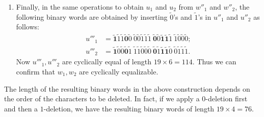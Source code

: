 \documentclass{article}
\theoremstyle{definition}
\begin{document}
\begin{enumerate}
    \item Finally, in the same operations to obtain $u_1$ and $u_2$ from $w''_1$ and $w''_2$, the following binary words are obtained by inserting $\tilde{0}$'s and $\tilde{1}$'s in $u''_1$ and $u''_2$ as follows:
    \[
        \begin{split}
            u'''_1&=\mathbf{\tilde{1}}\tilde{1}\tilde{1}\mathbf{\tilde{0}}\tilde{0}\ \tilde{0}\tilde{0}\tilde{1}\tilde{1}\tilde{1}\ \mathbf{\tilde{0}}\tilde{0}\mathbf{\tilde{1}\tilde{1}}\tilde{1}\ \tilde{1}\tilde{0}\tilde{0}\tilde{0}; \\
            u'''_2&=\mathbf{\tilde{1}}\tilde{0}\tilde{0}\mathbf{\tilde{0}}\tilde{1}\ \tilde{1}\tilde{1}\tilde{0}\tilde{0}\tilde{0}\ \mathbf{\tilde{0}}\tilde{1}\mathbf{\tilde{1}\tilde{1}}\tilde{0}\ \tilde{0}\tilde{1}\tilde{1}\tilde{1}.
        \end{split}
    \]
    Now $u'''_1, u'''_2$ are cyclically equal of length $19 \times 6 = 114$. Thus we can confirm that $w_1, w_2$ are cyclically equalizable. 
    \end{enumerate}

The length of the resulting binary words in the above construction depends on the order of the characters to be deleted. In fact, if we apply a $0$-deletion first and then a $1$-deletion, we have the resulting binary words of length $19 \times 4 = 76$. 
\end{document}
